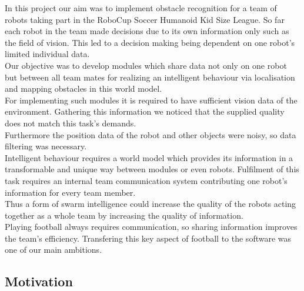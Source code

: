 \documentclass[lnicst,a4paper]{svmultln}
\begin{document}
In this project our aim was to implement obstacle recognition for a team of robots taking part in the RoboCup Soccer Humanoid Kid Size League. So far each robot in the team made decisions due to its own information only such as the field of vision. This led to a decision making being dependent on one robot's limited individual data.
\\
Our objective was to develop modules which share data not only on one robot but between all team mates for realizing an intelligent behaviour via localisation and mapping obstacles in this world model.
\\
For implementing such modules it is required to have sufficient vision data of the environment. Gathering this information we noticed that the supplied quality does not match this task's demands.
\\
Furthermore the position data of the robot and other objects were noisy, so data filtering was necessary.
\\
Intelligent behaviour requires a world model which provides its information in a transformable and unique way between modules or even robots. Fulfilment of this task requires an internal team communication system contributing one robot's information for every team member.
\\
Thus a form of swarm intelligence could increase the quality of the robots acting together as a whole team by increasing the quality of information.
\\
Playing football always requires communication, so sharing information improves the team's efficiency. Transfering this key aspect of football to the software was one of our main ambitions.





\subsection{Motivation}
\end{document}
